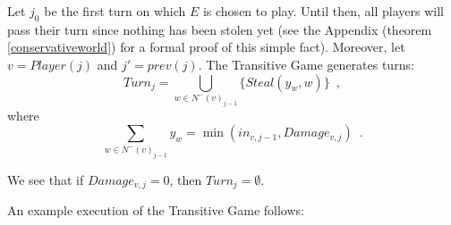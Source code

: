 \documentclass[11pt]{llncs}
\theoremstyle{definition}
\begin{document}
     Let $j_0$ be the first turn on which $E$ is chosen to play. Until then, all players will pass their turn since nothing
     has been stolen yet (see the Appendix (theorem \ref{conservativeworld}) for a formal proof of this simple fact).
     Moreover, let $v = Player(j)$ and $j' = prev\left(j\right)$.
     The Transitive Game generates turns:
     \begin{equation}
        Turn_j = \bigcup\limits_{w \in N^{-}\left(v\right)_{j-1}}\{Steal\left(y_w,w\right)\} \enspace,%
     \end{equation}
     where
     \begin{equation*}
        \sum\limits_{w \in N^{-}\left(v\right)_{j-1}}y_w = \min\left(in_{v, j-1}, Damage_{v, j}\right) \enspace.
     \end{equation*}
 
     We see that if $Damage_{v, j} = 0$, then $Turn_j = \emptyset$.

     An example execution of the Transitive Game follows:
\end{document}
